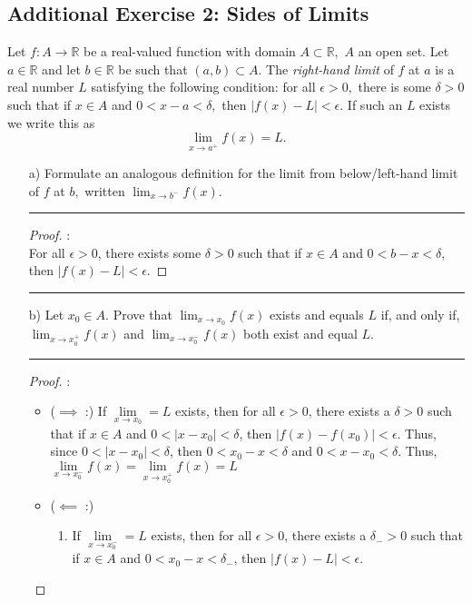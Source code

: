 \documentclass[openany, amssymb, psamsfonts]{amsart}
\newcommand{\bbR}{\mathbb{R}}
\theoremstyle{definition}
\numberwithin{equation}{section}
\begin{document}
\subsection*{Additional Exercise 2: Sides of Limits}
Let $f:A\longrightarrow \bbR$ be a real-valued function with domain $A\subset \bbR,$ $A$ an open set. Let $a\in\bbR$ and let 
$b\in\bbR$ be such that $(a,b)\subset A.$ The {\it right-hand limit} of $f$ at $a$ is a real number $L$ satisfying the following condition: for all $ \epsilon>0,$ there is some $\delta>0$ such that if $x\in A$ and $0<x-a<\delta,$ then $|f(x)-L|<\epsilon.$
If such an $L$ exists we write this as 
$$\lim_{x\longrightarrow a^+} f(x)=L.$$
\begin{enumerate}
\item[a)] Formulate an analogous definition for the limit from below/left-hand limit of $f$ at $b,$ written $\displaystyle \lim_{x\longrightarrow b^-} f(x).$ 
\vspace{4pt}     \hrule   \vspace{4pt}\begin{proof}:\\
    For all $\epsilon>0$, there exists some $\delta>0$ such that if $x\in A$ and $0<b-x<\delta$, then $|f(x) - L| < \epsilon$.
\end{proof}\vspace{4pt}     \hrule   \vspace{4pt}
\item[b)] Let $x_0\in A.$ Prove that $\displaystyle \lim_{x\longrightarrow x_0} f(x)$ exists and equals $L$ if, and only if, $\displaystyle \lim_{x\longrightarrow x_0^+} f(x)$ and
$\displaystyle \lim_{x\longrightarrow x_0^-}f(x)$ both exist and equal $L.$
\vspace{4pt}     \hrule   \vspace{4pt}\begin{proof}:\\
    \begin{itemize}
        \item ($\implies$ :) If $\lim\limits_{x\to x_0} = L$ exists, then for all $\epsilon>0$, there exists a $\delta>0$ such that if $x\in A$ and $0<|x-x_0|<\delta$, then $|f(x) - f(x_0)|<\epsilon$. Thus, since $0<|x-x_0|<\delta$, then $0<x_0-x<\delta$ and $0<x-x_0<\delta$. Thus, $\lim\limits_{x\to x_0^-} f(x) = \lim\limits_{x\to x_0^+}f(x) = L$
        \item ($\impliedby$ :) 
        \begin{enumerate}
            \item If $\lim\limits_{x\to x_0^-} = L$ exists, then for all $\epsilon>0$, there exists a $\delta_->0$ such that if $x\in A$ and $0<x_0-x<\delta_-$, then $|f(x) - L|<\epsilon$.

\end{enumerate}
\end{itemize}
\end{proof}
\end{enumerate}
\end{document}
